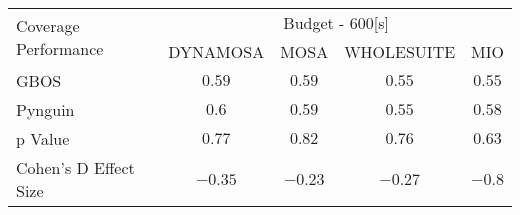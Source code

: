 \begin{tabular}{lcccc}\toprule 
\multirow{2}{*}{Coverage Performance} & \multicolumn{4}{c}{Budget - 600[s] } \\ \cmidrule(lr){2-5}  
                                      & DYNAMOSA&MOSA&WHOLESUITE&MIO                         \\ \midrule 
GBOS                                  & \(0.59\)&\(0.59\)&\(0.55\)&\(0.55\)                       \\ 
Pynguin                               & \(0.6\)&\(0.59\)&\(0.55\)&\(0.58\)                       \\ 
p Value                               & \(0.77\)&\(0.82\)&\(0.76\)&\(0.63\)                     \\ 
Cohen's D Effect Size                 & \(-0.35\)&\(-0.23\)&\(-0.27\)&\(-0.8\)                       \\ 
\bottomrule 
\end{tabular}